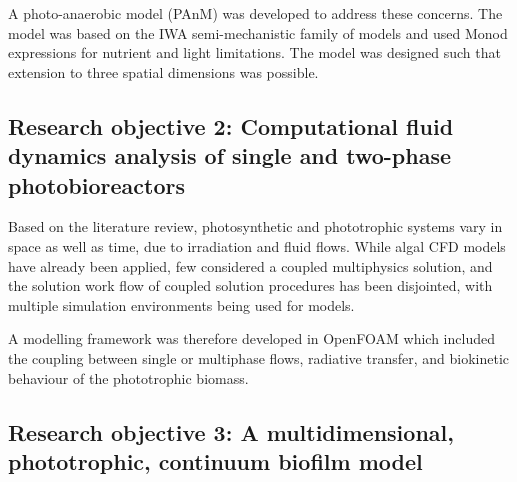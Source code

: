 A photo-anaerobic model (PAnM) was developed to address these concerns. The model was based on the IWA semi-mechanistic family of models and used Monod expressions for nutrient and light limitations. The model was designed such that extension to three spatial dimensions was possible. 

\subsection{Research objective 2: Computational fluid dynamics analysis of single and two-phase photobioreactors}
Based on the literature review, photosynthetic and phototrophic systems vary in space as well as time, due to irradiation and fluid flows. While algal CFD models have already been applied, few considered a coupled multiphysics solution, and the solution work flow of coupled solution procedures has been disjointed, with multiple simulation environments being used for models. 

A modelling framework was therefore developed in OpenFOAM which included the coupling between single or multiphase flows, radiative transfer, and biokinetic behaviour of the phototrophic biomass.

\subsection{Research objective 3: A multidimensional, phototrophic, continuum biofilm model}






